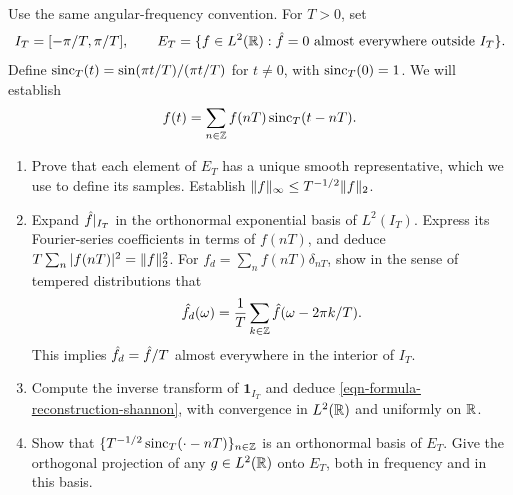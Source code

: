 
\begin{exo}
\label{exo-sample-shannon}
Use the same angular-frequency convention. For $T>0$, set
\[
 I_T=[-\pi/T,\pi/T],\qquad
 E_T=\{f\in L^2(\mathbb{R}):\hat{f}=0\text{ almost everywhere outside }I_T\}.
\]
Define $\operatorname{sinc}_T(t)=\sin(\pi t/T)/(\pi t/T)$ for $t\neq0$, with
$\operatorname{sinc}_T(0)=1$. We will establish
\begin{equation}
\label{eqn-formula-reconstruction-shannon}
 f(t)=\sum_{n\in\mathbb{Z}}f(nT)\operatorname{sinc}_T(t-nT).
\end{equation}
\begin{enumerate}
\item Prove that each element of $E_T$ has a unique smooth representative,
which we use to define its samples. Establish
$\lVert f\rVert_\infty\leq T^{-1/2}\lVert f\rVert_2$.
\item Expand $\hat{f}|_{I_T}$ in the orthonormal exponential basis of
$L^2(I_T)$. Express its Fourier-series coefficients in terms of $f(nT)$,
and deduce $T\sum_n|f(nT)|^2=\lVert f\rVert_2^2$.
For $f_d=\sum_nf(nT)\delta_{nT}$, show in the sense of tempered
distributions that
\[
 \hat{f_d}(\omega)=\frac1T\sum_{k\in\mathbb{Z}}
                     \hat{f}(\omega-2\pi k/T).
\]
This implies $\hat{f_d}=\hat{f}/T$ almost everywhere in the interior of $I_T$.
\item Compute the inverse transform of $\mathbf1_{I_T}$ and deduce
\eqref{eqn-formula-reconstruction-shannon}, with convergence in $L^2(\mathbb{R})$
and uniformly on $\mathbb{R}$.
\item Show that $\{T^{-1/2}\operatorname{sinc}_T(\cdot-nT)\}_{n\in\mathbb{Z}}$ is an
orthonormal basis of $E_T$. Give the orthogonal projection of any
$g\in L^2(\mathbb{R})$ onto $E_T$, both in frequency and in this basis.
\end{enumerate}
\end{exo}


